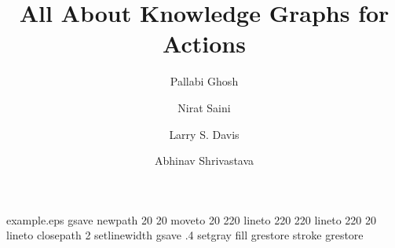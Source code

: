 \begin{filecontents*}{example.eps}
gsave
newpath
  20 20 moveto
  20 220 lineto
  220 220 lineto
  220 20 lineto
closepath
2 setlinewidth
gsave
  .4 setgray fill
grestore
stroke
grestore
\end{filecontents*}
\RequirePackage{fix-cm}
\documentclass[twocolumn] {svjour3}          \smartqed  \usepackage{graphicx}
\usepackage{breakcites}
\usepackage{flushend}
\usepackage{amsmath,amssymb} \usepackage[colorlinks,citecolor=blue,urlcolor=red,bookmarks=false,hypertexnames=true]{hyperref} 
\usepackage{dblfloatfix}
\usepackage{booktabs}

\DeclareMathDelimiter{\lVert}
  {\mathopen}{symbols}{"6B}{largesymbols}{"0D}
\DeclareMathDelimiter{\rVert}
  {\mathclose}{symbols}{"6B}{largesymbols}{"0D}

\sloppy
\title{All About Knowledge Graphs for Actions
}




\author{Pallabi Ghosh        \and
        Nirat Saini\and
        Larry S. Davis \and
        Abhinav Shrivastava
}







\maketitle

\begin{abstract}
Current action recognition systems require large amounts of training data for recognizing an action. Recent works have explored the paradigm of zero-shot and few-shot learning to learn classifiers for unseen categories or categories with few labels. Following similar paradigms in object recognition, these approaches utilize external sources of knowledge (eg. knowledge graphs from language domains). However, unlike objects, it is unclear what is the best knowledge representation for actions. In this paper, we intend to gain a better understanding of knowledge graphs (KGs) that can be utilized for zero-shot and few-shot action recognition. In particular, we study three different construction mechanisms for KGs: action embeddings, action-object embeddings, visual embeddings. We present extensive analysis of the impact of different KGs in different experimental setups. Finally, to enable a systematic study of zero-shot and few-shot approaches, we propose an improved evaluation paradigm based on UCF101, HMDB51, and Charades datasets for knowledge transfer from models trained on Kinetics.
\end{abstract}















